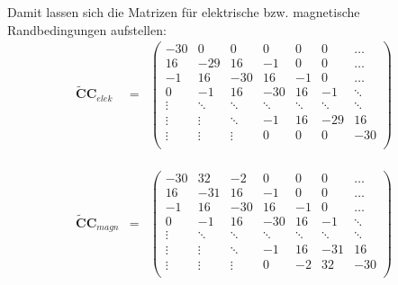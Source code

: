 \documentclass[Protokollheft.tex]{subfiles}
\begin{document}
Damit lassen sich die Matrizen für elektrische bzw. magnetische Randbedingungen aufstellen:
\begin{eqnarray*}
\mathbf{\widetilde{C}C}_{elek}&=&\begin{pmatrix} -30 & 0 & 0 & 0 & 0 & 0 & \dots \\ 
16 & -29 & 16 & -1 & 0 & 0 & \dots\\ 
-1 & 16 & -30 & 16 & -1 & 0 & \dots\\ 
0 & -1 & 16 & -30 & 16 & -1 & \ddots\\ 
\vdots & \ddots & \ddots & \ddots & \ddots & \ddots & \ddots\\
\vdots & \vdots & \ddots & -1 & 16 & -29 & 16\\
\vdots & \vdots & \vdots & 0 & 0 & 0 & -30\\
\end{pmatrix}
\\
\\
\\
\\
\mathbf{\widetilde{C}C}_{magn}&=&\begin{pmatrix} -30 & 32 & -2 & 0 & 0 & 0 & \dots \\ 
	16 & -31 & 16 & -1 & 0 & 0 & \dots\\ 
	-1 & 16 & -30 & 16 & -1 & 0 & \dots\\ 
	0 & -1 & 16 & -30 & 16 & -1 & \ddots\\ 
	\vdots & \ddots & \ddots & \ddots & \ddots & \ddots & \ddots\\
	\vdots & \vdots & \ddots & -1 & 16 & -31 & 16\\
	\vdots & \vdots & \vdots & 0 & -2 & 32 & -30\\
\end{pmatrix}
\end{eqnarray*}
\end{document}
